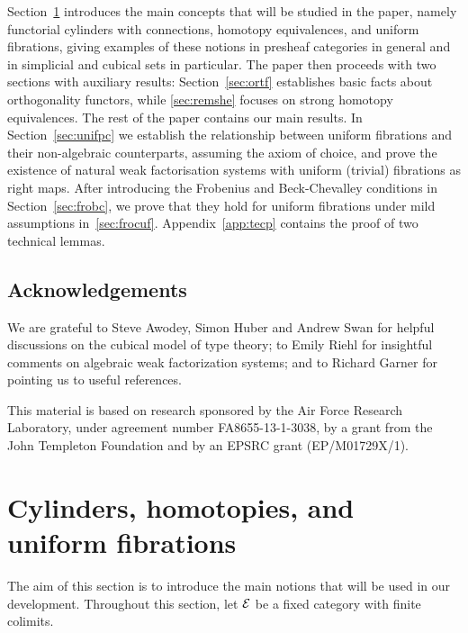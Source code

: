 \documentclass[reqno,10pt,a4paper,oneside,draft]{amsart}
\begin{document}
Section~\ref{sec:cylhuf} introduces the main concepts that will be studied in the paper, namely functorial cylinders with connections, homotopy equivalences, and uniform fibrations, giving examples of these notions in presheaf categories in general and in simplicial and cubical sets in particular.
The paper then proceeds with two sections with auxiliary results: Section~\ref{sec:ortf} establishes basic facts about orthogonality functors, while \cref{sec:remshe} focuses on strong homotopy equivalences.
The rest of the paper contains our main results.
In Section~\ref{sec:unifpc} we establish the relationship between uniform fibrations and their non-algebraic counterparts, assuming the axiom of choice, and prove the existence of natural weak factorisation systems with uniform (trivial) fibrations as right maps.
After introducing the Frobenius and Beck-Chevalley conditions in Section~\ref{sec:frobc}, we prove that they hold for uniform fibrations under mild assumptions in~\cref{sec:frocuf}.
Appendix~\ref{app:tecp} contains the proof of two technical lemmas.

\subsection*{Acknowledgements}  We are grateful to Steve Awodey, Simon Huber and Andrew Swan for helpful discussions on the cubical model of type theory; to Emily Riehl for insightful comments on algebraic weak factorization systems; and to Richard Garner for pointing us to useful references.

This material is based on research sponsored by the Air Force Research Laboratory, under agreement number FA8655-13-1-3038, by a grant from the John Templeton Foundation and by an EPSRC grant (EP/M01729X/1).


\section{Cylinders, homotopies, and uniform fibrations}
\label{sec:cylhuf}

The aim of this section is to introduce the main notions that will be used in our development. Throughout this section, let $\mathcal{E}$ be a 
fixed category with finite colimits. 
\end{document}

